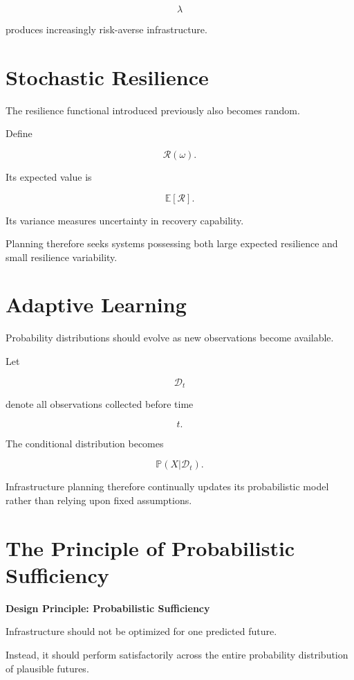 \documentclass[11pt,fleqn]{book}
\numberwithin{equation}{chapter}
\newenvironment{principle}[1]
  {\begin{principleEnv}
   \noindent\textbf{Design Principle: #1}\par\smallskip\itshape}
  {\end{principleEnv}}
\theoremstyle{plain}
\theoremstyle{definition}
\theoremstyle{remark}
\begin{document}
\[
\lambda
\]

produces increasingly risk-averse infrastructure.


\section{Stochastic Resilience}

The resilience functional introduced previously also becomes random.

Define

\[
\mathcal R(\omega).
\]

Its expected value is

\[
\mathbb E[\mathcal R].
\]

Its variance measures uncertainty in recovery capability.

Planning therefore seeks systems possessing both large expected
resilience and small resilience variability.


\section{Adaptive Learning}

Probability distributions should evolve as new observations become
available.

Let

\[
\mathcal D_t
\]

denote all observations collected before time

\[
t.
\]

The conditional distribution becomes

\[
\mathbb P(X|\mathcal D_t).
\]

Infrastructure planning therefore continually updates its probabilistic
model rather than relying upon fixed assumptions.


\section{The Principle of Probabilistic Sufficiency}

\begin{principle}{Probabilistic Sufficiency}

Infrastructure should not be optimized for one predicted future.

Instead, it should perform satisfactorily across the entire probability
distribution of plausible futures.

\end{principle}
\end{document}
